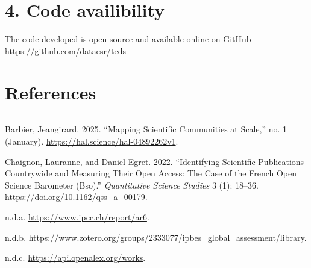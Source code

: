 \documentclass[
]{article}
\newlength{\cslhangindent}
\newenvironment{cslreferences}%
  {\setlength{\parindent}{0pt}%
  \everypar{\setlength{\hangindent}{\cslhangindent}}\ignorespaces}%
  {\par}
\begin{document}
\hypertarget{code-availibility}{%
\section{4. Code availibility}\label{code-availibility}}

The code developed is open source and available online on GitHub
\url{https://github.com/dataesr/teds}

\hypertarget{references}{%
\section{References}\label{references}}

\begin{verbatim}
\end{verbatim}

\hypertarget{refs}{}
\begin{cslreferences}
\leavevmode\hypertarget{ref-hal-04892262}{}%
Barbier, Jeangirard. 2025. ``Mapping Scientific Communities at Scale,''
no. 1 (January). \url{https://hal.science/hal-04892262v1}.

\leavevmode\hypertarget{ref-10.1162ux2fqss_a_00179}{}%
Chaignon, Lauranne, and Daniel Egret. 2022. ``Identifying Scientific
Publications Countrywide and Measuring Their Open Access: The Case of
the French Open Science Barometer (Bso).'' \emph{Quantitative Science
Studies} 3 (1): 18--36. \url{https://doi.org/10.1162/qss_a_00179}.

\leavevmode\hypertarget{ref-ipccbibliography}{}%
n.d.a. \url{https://www.ipcc.ch/report/ar6}.

\leavevmode\hypertarget{ref-ipbesbibliography}{}%
n.d.b.
\url{https://www.zotero.org/groups/2333077/ipbes_global_assessment/library}.

\leavevmode\hypertarget{ref-OpenAlexAPI}{}%
n.d.c. \url{https://api.openalex.org/works}.
\end{cslreferences}
\end{document}
